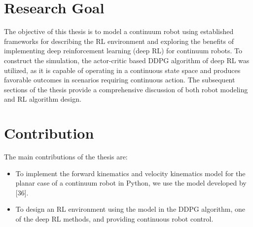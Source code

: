 \documentclass[12pt,twoside,a4]{mwbk}
\begin{document}
\section{Research Goal}
The objective of this thesis is to model a continuum robot using established frameworks for describing the RL environment and exploring the benefits of implementing deep reinforcement learning (deep RL) for continuum robots. To construct the simulation, the actor-critic based DDPG algorithm of deep RL was utilized, as it is capable of operating in a continuous state space and produces favorable outcomes in scenarios requiring continuous action. The subsequent sections of the thesis provide a comprehensive discussion of both robot modeling and RL algorithm design.
\section{Contribution}
The main contributions of the thesis are:
\begin{itemize}
    \item To implement the forward kinematics and velocity kinematics model for the planar case of a continuum robot in Python, we use the model developed by [36].
    \item To design an RL environment using the model in the DDPG algorithm, one of the deep RL methods, and providing continuous robot control.
\end{itemize}
\end{document}
